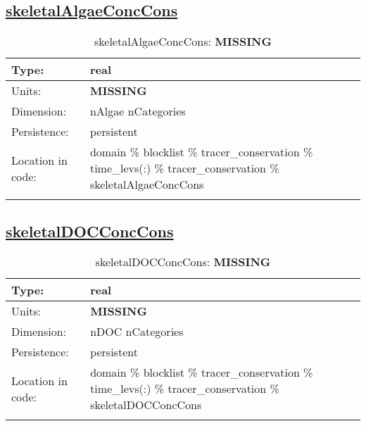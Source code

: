 \subsection[skeletalAlgaeConcCons]{\hyperref[sec:var_tab_tracer_conservation]{skeletalAlgaeConcCons}}
\label{subsec:var_sec_tracer_conservation_skeletalAlgaeConcCons}
\begin{center}
\begin{longtable}{| p{2.0in} | p{4.0in} |}
        \hline 
        Type: & real \\
        \hline 
        Units: & {\bf \color{red} MISSING} \\
        \hline 
        Dimension: & nAlgae nCategories \\
        \hline 
        Persistence: & persistent \\
        \hline 
         Location in code: & domain \% blocklist \% tracer\_conservation \% time\_levs(:) \% tracer\_conservation \% skeletalAlgaeConcCons \\
         \hline 
    \caption{skeletalAlgaeConcCons: {\bf \color{red} MISSING}}
\end{longtable}
\end{center}
\subsection[skeletalDOCConcCons]{\hyperref[sec:var_tab_tracer_conservation]{skeletalDOCConcCons}}
\label{subsec:var_sec_tracer_conservation_skeletalDOCConcCons}
\begin{center}
\begin{longtable}{| p{2.0in} | p{4.0in} |}
        \hline 
        Type: & real \\
        \hline 
        Units: & {\bf \color{red} MISSING} \\
        \hline 
        Dimension: & nDOC nCategories \\
        \hline 
        Persistence: & persistent \\
        \hline 
         Location in code: & domain \% blocklist \% tracer\_conservation \% time\_levs(:) \% tracer\_conservation \% skeletalDOCConcCons \\
         \hline 
    \caption{skeletalDOCConcCons: {\bf \color{red} MISSING}}
\end{longtable}
\end{center}
